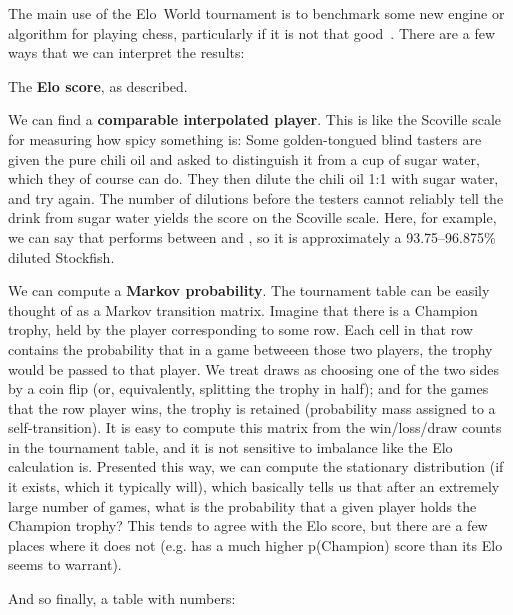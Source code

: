 \documentclass[10pt,preprint,twocolumn]{acmart}
\begin{document}
The main use of the Elo~World tournament is to benchmark some new
engine or algorithm for playing chess, particularly if it is not that
good~\cite{blind}. There are a few ways that we can interpret the
results:

The {\bf Elo score}, as described.

We can find a {\bf comparable interpolated player}. This is like the
  Scoville scale for measuring how spicy something is: Some
  golden-tongued blind tasters are given the pure chili oil and asked
  to distinguish it from a cup of sugar water, which they of course
  can do. They then dilute the chili oil 1:1 with sugar water, and try
  again. The number of dilutions before the testers cannot reliably
  tell the drink from sugar water yields the score on the Scoville
  scale. Here, for example, we can say that 
  performs between  and
  , so it is approximately a
  93.75--96.875\% diluted Stockfish.

We can compute a {\bf Markov probability}. The tournament table can be
  easily thought of as a Markov transition matrix.
  Imagine that there is a
  Champion trophy, held by the player corresponding to some row. Each
  cell in that row contains the probability that in a game betweeen
  those two players, the trophy would be passed to that player. We
  treat draws as choosing one of the two sides by a coin flip (or,
  equivalently, splitting the trophy in half); and for the games that
  the row player wins, the trophy is retained (probability mass assigned
  to a self-transition). It is easy to compute this matrix from the
  win/loss/draw counts in the tournament table, and it is not sensitive
  to imbalance like the Elo calculation is.
  Presented this way, we can compute the stationary distribution (if
  it exists, which it typically will), which basically tells us that
  after an extremely large number of games, what is the probability
  that a given player holds the Champion trophy? This tends to
  agree with the Elo score, but there are a few places where it does
  not (e.g.  has a much higher p(Champion) score
  than its Elo seems to warrant).

And so finally, a table with numbers:
\smallskip
\end{document}
